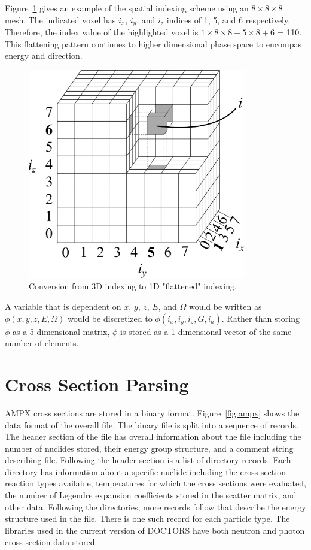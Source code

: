 Figure~\ref{fig:indx_ex} gives an example of the spatial indexing scheme using an $8 \times 8 \times 8$ mesh. The indicated voxel has $i_x$, $i_y$, and $i_z$ indices of 1, 5, and 6 respectively. Therefore, the index value of the highlighted voxel is $1 \times 8 \times 8 + 5 \times 8 + 6$ = 110. This flattening pattern continues to higher dimensional phase space to encompas energy and direction.

\begin{figure}[tb]
  \begin{center}
   \includegraphics[width=3.75in]{figs/indx_ex}
  \end{center}
  \caption{Conversion from 3D indexing to 1D "flattened" indexing.}
\label{fig:indx_ex}
\end{figure}

A variable that is dependent on $x$, $y$, $z$, $E$, and $\Omega$ would be written as $\phi(x, y, z, E, \Omega)$ would be discretized to $\phi(i_x, i_y, i_z, G, i_a)$. Rather than storing $\phi$ as a 5-dimensional matrix, $\phi$ is stored as a 1-dimensional vector of the same number of elements.

\section{Cross Section Parsing}\label{sec:xsparse}
AMPX cross sections are stored in a binary format. Figure~\ref{fig:ampx} shows the data format of the overall file. The binary file is split into a sequence of records. The header section of the file has overall information about the file including the number of nuclides stored, their energy group structure, and a comment string describing file. Following the header section is a list of directory records. Each directory has information about a specific nuclide including the cross section reaction types available, temperatures for which the cross sections were evaluated, the number of Legendre expansion coefficients stored in the scatter matrix, and other data. Following the directories, more records follow that describe the energy structure used in the file. There is one such record for each particle type. The libraries used in the current version of DOCTORS have both neutron and photon cross section data stored.

